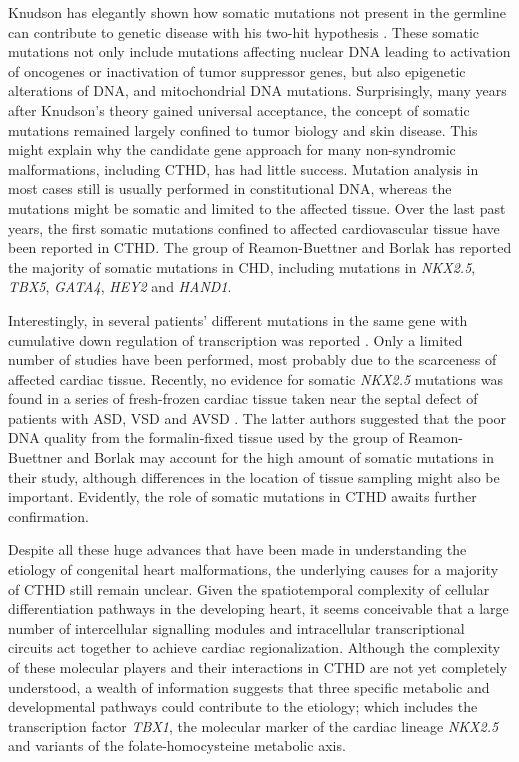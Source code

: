 \begin{refsection}
Knudson has elegantly shown how somatic mutations not present in the germline can contribute to genetic disease with his two-hit hypothesis \cite{knudson1972mutation}. These somatic mutations not only include mutations affecting nuclear DNA leading to activation of oncogenes or inactivation of tumor suppressor genes, but also epigenetic alterations of DNA, and mitochondrial DNA mutations. Surprisingly, many years after Knudson’s theory gained universal acceptance, the concept of somatic mutations remained largely confined to tumor biology and skin disease. This might explain why the candidate gene approach for many non-syndromic malformations, including CTHD, has had little success. Mutation analysis in most cases still is usually performed in constitutional DNA, whereas the mutations might be somatic and limited to the affected tissue. Over the last past years, the first somatic mutations confined to affected cardiovascular tissue have been reported in CTHD. 
The group of Reamon-Buettner and Borlak \cite{reamon2006bridging,reamon2006hey2,reamon2004tbx5,reamon2004novel,reamon2004somatic,reamon2006somatic,reamon2008loss} has reported the majority of somatic mutations in CHD, including mutations in \textit{NKX2.5}, \textit{TBX5}, \textit{GATA4}, \textit{HEY2} and \textit{HAND1}.

Interestingly, in several patients’ different mutations in the same gene with cumulative down regulation of transcription was reported \cite{reamon2006bridging,reamon2006hey2,reamon2004tbx5,reamon2004novel,reamon2004somatic,reamon2006somatic,reamon2008loss}. Only a limited number of studies have been performed, most probably due to the scarceness of affected cardiac tissue. Recently, no evidence for somatic \textit{NKX2.5} mutations was found in a series of fresh-frozen cardiac tissue taken near the septal defect of patients with ASD, VSD and AVSD \cite{draus2009investigation}. The latter authors suggested that the poor DNA quality from the formalin-fixed tissue used by the group of Reamon-Buettner and Borlak may account for the high amount of somatic mutations in their study, although differences in the location of tissue sampling might also be important. Evidently, the role of somatic mutations in CTHD awaits further confirmation.

Despite all these huge advances that have been made in understanding the etiology of congenital heart malformations, the underlying causes for a majority of CTHD still remain unclear. Given the spatiotemporal complexity of cellular differentiation pathways in the developing heart, it seems conceivable that a large number of intercellular signalling modules and intracellular transcriptional circuits act together to achieve cardiac regionalization. Although the complexity of these molecular players and their interactions in CTHD are not yet completely understood, a wealth of information suggests that three specific metabolic and developmental pathways could contribute to the etiology; which includes the transcription factor \textit{TBX1}, the molecular marker of the cardiac lineage \textit{NKX2.5} and variants of the folate-homocysteine metabolic axis.


\end{refsection}
